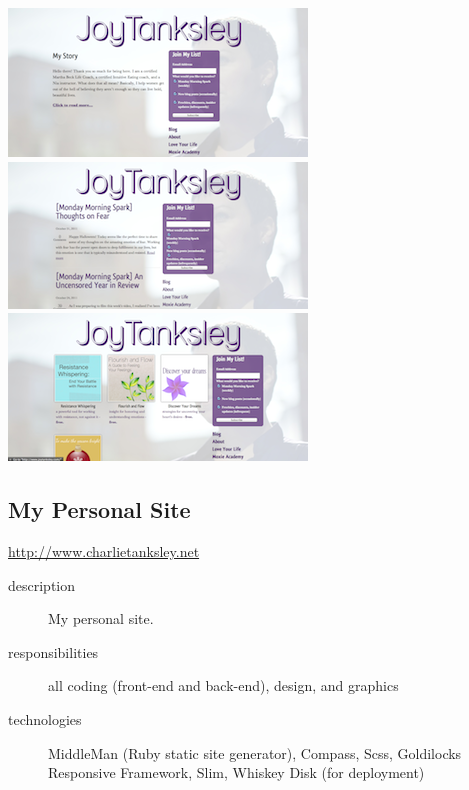 \documentclass{article}
\begin{document}
\includegraphics[scale=.5]{../source/images/portfolio/joytanksley-about-sm.png}
\includegraphics[scale=.5]{../source/images/portfolio/joytanksley-blog-sm.png}
\includegraphics[scale=.5]{../source/images/portfolio/joytanksley-products-sm.png}

\subsection{My Personal Site} %
\label{sub:My Personal Site}

\href{http://www.charlietanksley.net}{http://www.charlietanksley.net}

\begin{description}
  \item[description] My personal site. 
  \item[responsibilities] all coding (front-end and back-end), design, and graphics 
  \item[technologies] MiddleMan (Ruby static site generator), Compass, Scss, Goldilocks Responsive Framework, Slim, Whiskey Disk (for deployment)
\end{description}


\end{document}
